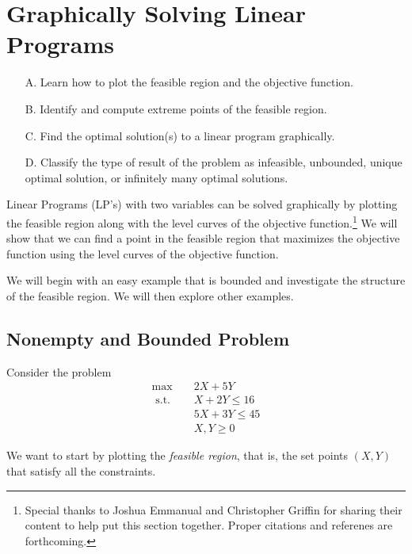 \chapter{Graphically Solving Linear Programs}
\begin{outcome}
\begin{enumerate}
\item[A.] Learn how to plot the feasible region and the objective function.
\item[B.] Identify and compute extreme points of the feasible region.
\item[C.] Find the optimal solution(s) to a linear program graphically.
\item[D.] Classify the type of result of the problem as infeasible, unbounded, unique optimal solution, or infinitely many optimal solutions.
\end{enumerate}
\end{outcome}

Linear Programs (LP's) with two variables can be solved graphically by plotting the feasible region along with the level curves of the objective function.\footnote{Special thanks to Joshua Emmanual and Christopher Griffin for sharing their content to help put this section together. Proper citations and referenes are forthcoming.} We will show that we can find a point in the feasible region that maximizes the objective function using the level curves of the objective function.

We will begin with an easy example that is bounded and investigate the structure of the feasible region.  We will then explore other examples.
\section{Nonempty and Bounded Problem}
Consider the problem
\begin{align*}
\max \quad & 2 X+5 Y \\
\text { s.t. } \quad 
&X+2 Y \leq 16 \\
&5 X+3 Y \leq  45 \\
&X, Y  \geq 0
\end{align*}

We want to start by plotting the \emph{feasible region}, that is, the set points $(X,Y)$ that satisfy all the constraints. 

